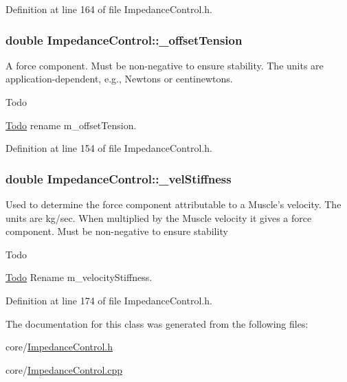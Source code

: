 Definition at line 164 of file Impedance\-Control.\-h.

\hypertarget{class_impedance_control_a2c5a6ed274fdd9f44708c5c74c520bd7}{
\subsubsection[{\-\_\-offset\-Tension}]{\setlength{\rightskip}{0pt plus 5cm}double Impedance\-Control\-::\-\_\-offset\-Tension\hspace{0.3cm}{\ttfamily [protected]}}}\label{class_impedance_control_a2c5a6ed274fdd9f44708c5c74c520bd7}
A force component. Must be non-\/negative to ensure stability. The units are application-\/dependent, e.\-g., Newtons or centinewtons. \begin{DoxyRefDesc}{Todo}
\item[\hyperlink{todo__todo000002}{Todo}]rename m\-\_\-offset\-Tension. \end{DoxyRefDesc}


Definition at line 154 of file Impedance\-Control.\-h.

\hypertarget{class_impedance_control_af5bf17d7b651e84912e666b3bc3a25e4}{
\subsubsection[{\-\_\-vel\-Stiffness}]{\setlength{\rightskip}{0pt plus 5cm}double Impedance\-Control\-::\-\_\-vel\-Stiffness\hspace{0.3cm}{\ttfamily [protected]}}}\label{class_impedance_control_af5bf17d7b651e84912e666b3bc3a25e4}
Used to determine the force component attributable to a Muscle's velocity. The units are kg/sec. When multiplied by the Muscle velocity it gives a force component. Must be non-\/negative to ensure stability \begin{DoxyRefDesc}{Todo}
\item[\hyperlink{todo__todo000004}{Todo}]Rename m\-\_\-velocity\-Stiffness. \end{DoxyRefDesc}


Definition at line 174 of file Impedance\-Control.\-h.



The documentation for this class was generated from the following files\-:\begin{DoxyCompactItemize}
\item 
core/\hyperlink{_impedance_control_8h}{Impedance\-Control.\-h}\item 
core/\hyperlink{_impedance_control_8cpp}{Impedance\-Control.\-cpp}\end{DoxyCompactItemize}
